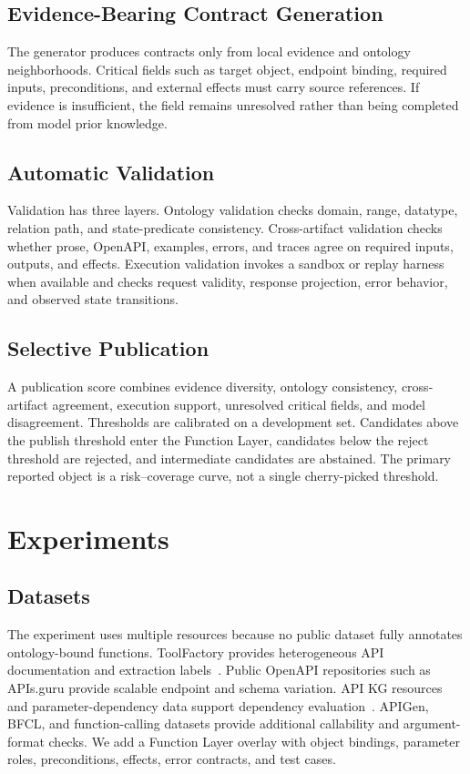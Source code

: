 \documentclass[10pt,twocolumn]{article}
\begin{document}
\subsection{Evidence-Bearing Contract Generation}
The generator produces contracts only from local evidence and ontology neighborhoods. Critical fields such as target object, endpoint binding, required inputs, preconditions, and external effects must carry source references. If evidence is insufficient, the field remains unresolved rather than being completed from model prior knowledge.

\subsection{Automatic Validation}
Validation has three layers. Ontology validation checks domain, range, datatype, relation path, and state-predicate consistency. Cross-artifact validation checks whether prose, OpenAPI, examples, errors, and traces agree on required inputs, outputs, and effects. Execution validation invokes a sandbox or replay harness when available and checks request validity, response projection, error behavior, and observed state transitions.

\subsection{Selective Publication}
A publication score combines evidence diversity, ontology consistency, cross-artifact agreement, execution support, unresolved critical fields, and model disagreement. Thresholds are calibrated on a development set. Candidates above the publish threshold enter the Function Layer, candidates below the reject threshold are rejected, and intermediate candidates are abstained. The primary reported object is a risk--coverage curve, not a single cherry-picked threshold.

\section{Experiments}
\subsection{Datasets}
The experiment uses multiple resources because no public dataset fully annotates ontology-bound functions. ToolFactory provides heterogeneous API documentation and extraction labels~\cite{ni2025toolfactory}. Public OpenAPI repositories such as APIs.guru provide scalable endpoint and schema variation. API KG resources and parameter-dependency data support dependency evaluation~\cite{sun2025apikg,lee2025innout}. APIGen, BFCL, and function-calling datasets provide additional callability and argument-format checks. We add a Function Layer overlay with object bindings, parameter roles, preconditions, effects, error contracts, and test cases.
\end{document}
